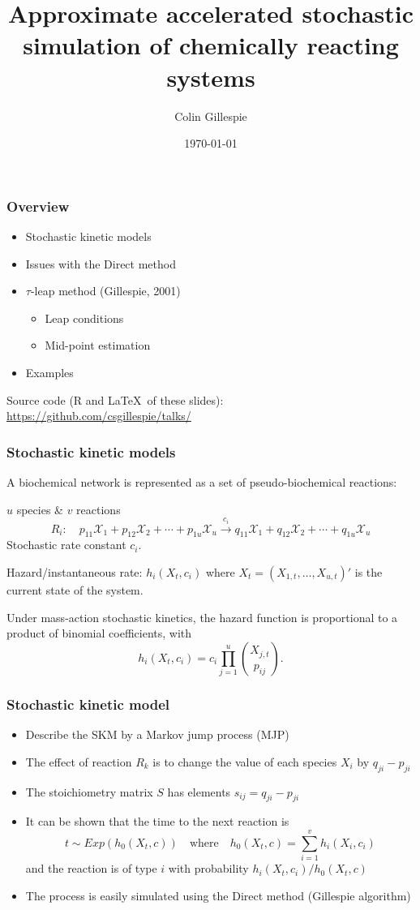 \documentclass[t,compress]{beamer}
\title[Approximate accelerated stochastic simulation of chemically reacting systems]{Approximate accelerated stochastic simulation of chemically reacting systems}
\author[]{Colin Gillespie}
\date{\today}
\begin{document}
\maketitle

\begin{frame}
\frametitle{Overview}
\begin{itemize}
\item Stochastic kinetic models
\item Issues with the Direct method
\item $\tau$-leap method (Gillespie, 2001)
\begin{itemize}
\item Leap conditions
\item Mid-point estimation
\end{itemize}
\item Examples
\end{itemize}
{\small
Source code (R and \LaTeX\ of these slides):\\
\alert{\url{https://github.com/csgillespie/talks/}}}

\end{frame}


\begin{frame}
\frametitle{Stochastic kinetic models}

\noindent A biochemical network is represented as a set of pseudo-biochemical reactions:
\begin{block}{$u$ species \& $v$ reactions}
\[
R_i:\quad p_{11}\mathcal{X}_1+p_{12}\mathcal{X}_2+\cdots+p_{1u}\mathcal{X}_u 
\xrightarrow{c_i}
q_{11}\mathcal{X}_1+q_{12}\mathcal{X}_2+\cdots+q_{1u}\mathcal{X}_u
\]
Stochastic rate constant $c_i$.
\end{block}
Hazard/instantaneous rate: $h_i(X_t, c_i)$ where $X_t = (X_{1,t}, \ldots, X_{u,t})′$ is
the current state of the system.

Under mass-action stochastic kinetics, the hazard function is proportional to a
product of binomial coefficients, with
\[
h_i(X_t,c_i) = c_i\prod_{j=1}^u \binom{X_{j,t}}{p_{ij}}.
\]

\end{frame}

\begin{frame}
\frametitle{Stochastic kinetic model}
\begin{itemize}
\item Describe the SKM by a Markov jump process (MJP)
\item The effect of reaction $R_k$ is to change the value of each species $X_i$ by
$q_{ji} - p_{ji}$
\item The stoichiometry matrix $S$ has elements $s_{ij} = q_{ji} - p_{ji}$
\item It can be shown that the time to the next reaction is
\[
t \sim Exp(h_0 (X_t , c))
\quad\text{where}\quad
h_0(X_t , c) =\sum_{i=1}^v h_i(X_i, c_i)
\]
and the reaction is of type $i$ with probability $h_i(X_t, c_i)/h_0(X_t , c)$
\item The process is easily simulated using the Direct method (Gillespie algorithm)
\end{itemize}
\end{frame}
\end{document}
